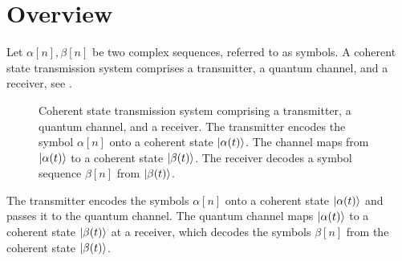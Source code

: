 \section{Overview}

Let $\alpha[n],\beta[n]$ be two complex sequences, referred to as symbols.
A coherent state transmission system comprises a transmitter, a quantum channel, and a receiver, see .
\begin{figure}[htb]
	\centering
	
	\caption{Coherent state transmission system comprising a transmitter, a quantum channel, and a receiver. The transmitter encodes the symbol $\alpha[n]$ onto a coherent state $\ket{\alpha(t)}$. The channel maps from $\ket{\alpha(t)}$ to a coherent state $\ket{\beta(t)}$. The receiver decodes a symbol sequence $\beta[n]$ from $\ket{\beta(t)}$.}\label{fig:transmission_system}
\end{figure}
The transmitter encodes the symbols $\alpha[n]$ onto a coherent state $\ket{\alpha(t)}$ and passes it to the quantum channel.
The quantum channel maps $\ket{\alpha(t)}$ to a coherent state $\ket{\beta(t)}$ at a receiver, which decodes the symbols $\beta[n]$ from the coherent state $\ket{\beta(t)}$.